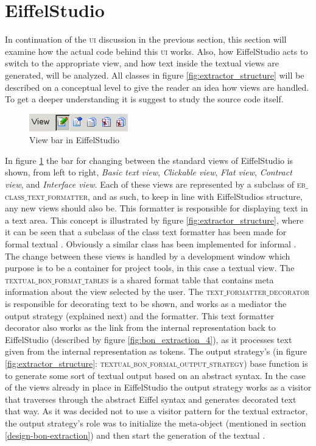 \section{EiffelStudio}
\label{implementation_eiffelstudio}
In continuation of the \textsc{ui} discussion in the previous section, this section will examine how the actual code behind this \textsc{ui} works. Also, how EiffelStudio acts to switch to the appropriate view, and how text inside the textual views are generated, will be analyzed. All classes in figure \ref{fig:extractor_structure} will be described on a conceptual level to give the reader an idea how views are handled. To get a deeper understanding it is suggest to study the source code itself.

\begin{figure}[H]
\centering
\includegraphics[scale=0.8]{images/es0.png}
\caption{View bar in EiffelStudio}
\label{fig:EiffelStudio0}
\end{figure}

In figure \ref{fig:EiffelStudio0} the bar for changing between the standard views of EiffelStudio is shown, from left to right, \textit{Basic text view}, \textit{Clickable view}, \textit{Flat view}, \textit{Contract view}, and \textit{Interface view}. Each of these views are represented by a subclass of \textsc{eb$\_$class$\_$text$\_$formatter}, and as such, to keep in line with EiffelStudios structure, any new views should also be. This formatter is responsible for displaying text in a text area. This concept is illustrated by figure \ref{fig:extractor_structure}, where it can be seen that a subclass of the class text formatter has been made for formal textual \bon. Obviously a similar class has been implemented for informal \bon. The change between these views is handled by a development window which purpose is to be a container for project tools, in this case a textual view. The \textsc{textual$\_$bon$\_$format$\_$tables} is a shared format table that contains meta information about the view selected by the user. The \textsc{text$\_$formatter$\_$decorator} is responsible for decorating text to be shown, and works as a mediator the output strategy (explained next) and the formatter. This text formatter decorator also works as the link from the internal representation back to EiffelStudio (described by figure \ref{fig:bon_extraction_4}), as it processes text given from the internal \bon{} representation as tokens. The output strategy's (in figure \ref{fig:extractor_structure}: \textsc{textual$\_$bon$\_$formal$\_$output$\_$strategy}) base function is to generate some sort of textual output based on an abstract syntax. In the case of the views already in place in EiffelStudio the output strategy works as a visitor that traverses through the abstract Eiffel syntax and generates decorated text that way. As it was decided not to use a visitor pattern for the textual \bon{} extractor, the output strategy's role was to initialize the meta-object (mentioned in section \ref{design-bon-extraction}) and then start the generation of the textual \bon.

